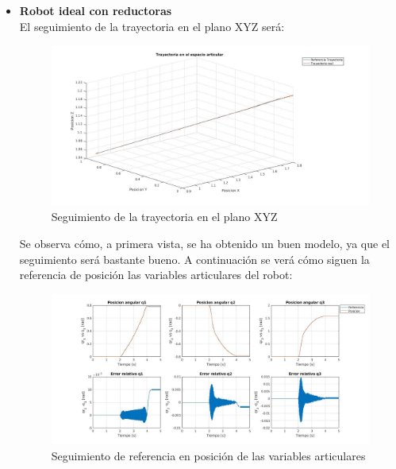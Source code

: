 \begin{itemize}
	
	\item \textbf{Robot ideal con reductoras} \\
	
	El seguimiento de la trayectoria en el plano XYZ será:
	
	\begin{figure}[h!]
		
		\centering
		
		\includegraphics[width=.8\textwidth]{exp3_trayPDideal}
		
		\caption{Seguimiento de la trayectoria en el plano XYZ}
		
	\end{figure}
	
	
	
	Se observa cómo, a primera vista, se ha obtenido un buen modelo, ya que el seguimiento será bastante bueno. A continuación se verá cómo siguen la referencia de posición las variables articulares del robot:
	
	
	
	\begin{figure}[h!]
		
		\centering
		
		\includegraphics[width=.8\textwidth]{exp3_posPDidealCR}
		
		\caption{Seguimiento de referencia en posición de las variables articulares}
		
	\end{figure}
	

\end{itemize}
